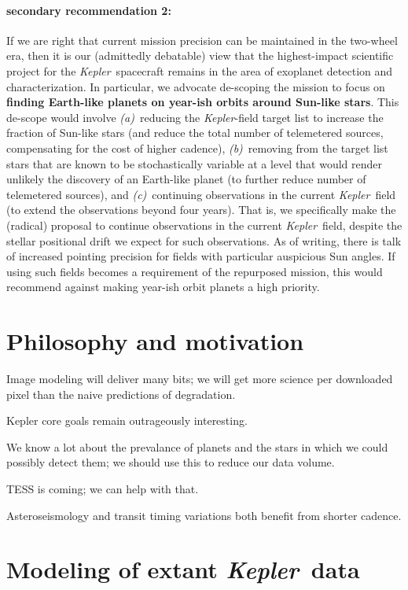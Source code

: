 \documentclass[12pt]{article}
\newcommand{\observatory}[1]{\textsl{#1}}
\newcommand{\kepler}{\observatory{Kepler}}
\newcommand{\Kepler}{\kepler}
\begin{document}
\paragraph{secondary recommendation 2:}
If we are right that current mission precision can be maintained in the two-wheel era,
  then it is our (admittedly debatable) view that the highest-impact scientific project for the \Kepler\ spacecraft
  remains in the area of exoplanet detection and characterization.
In particular, we advocate de-scoping the mission to focus on
  \textbf{finding Earth-like planets on year-ish orbits around Sun-like stars}.
This de-scope would involve
  \textsl{(a)}~reducing the \Kepler-field target list to increase the fraction of Sun-like stars
  (and reduce the total number of telemetered sources, compensating for the cost of higher cadence),
  \textsl{(b)}~removing from the target list stars that are known to be stochastically variable
  at a level that would render unlikely the discovery of an Earth-like planet
  (to further reduce number of telemetered sources),
  and \textsl{(c)}~continuing observations in the current \Kepler\ field
  (to extend the observations beyond four years).
That is, we specifically make the (radical) proposal to continue observations in the current \Kepler\ field,
  despite the stellar positional drift we expect for such observations.
As of writing, there is talk of increased pointing precision for fields with particular auspicious Sun angles.
If using such fields becomes a requirement of the repurposed mission,
  this would recommend against making year-ish orbit planets a high priority.

\section{Philosophy and motivation}

Image modeling will deliver many bits; we will get more science per
downloaded pixel than the naive predictions of degradation.

Kepler core goals remain outrageously interesting.

We know a lot about the prevalance of planets and the stars in which
we could possibly detect them; we should use this to reduce our data
volume.

TESS is coming; we can help with that.

Asteroseismology and transit timing variations both benefit from
shorter cadence.

\section{Modeling of extant \Kepler\ data}\label{sec:extant}
\end{document}
